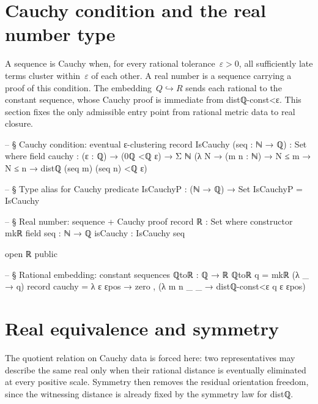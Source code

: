 \documentclass[11pt,a4paper]{book}
\def\mathbb#1{#1}%
\def\texttt#1{#1}%
\begin{document}
\section{Cauchy condition and the real number type}

A sequence is Cauchy when, for every rational tolerance~$\varepsilon > 0$,
all sufficiently late terms cluster within~$\varepsilon$ of each other.
A real number is a sequence carrying a proof of this condition.
The embedding~$\mathbb{Q} \hookrightarrow \mathbb{R}$ sends each rational
to the constant sequence, whose Cauchy proof is immediate from
\texttt{distℚ-const<ε}.  This section fixes the only admissible entry point
from rational metric data to real closure.

\begin{code}
-- § Cauchy condition: eventual ε-clustering
record IsCauchy (seq : ℕ → ℚ) : Set where
  field
    cauchy : (ε : ℚ) → (0ℚ <ℚ ε) → Σ ℕ (λ N → (m n : ℕ) → N ≤ m → N ≤ n → distℚ (seq m) (seq n) <ℚ ε)

-- § Type alias for Cauchy predicate
IsCauchyP : (ℕ → ℚ) → Set
IsCauchyP = IsCauchy

-- § Real number: sequence + Cauchy proof
record ℝ : Set where
  constructor mkℝ
  field
    seq : ℕ → ℚ
    isCauchy : IsCauchy seq

open ℝ public

-- § Rational embedding: constant sequences
ℚtoℝ : ℚ → ℝ
ℚtoℝ q = mkℝ (λ _ → q) record
  { cauchy = λ ε εpos →
      zero , (λ m n _ _ → distℚ-const<ε q ε εpos)
  }
\end{code}


\section{Real equivalence and symmetry}

The quotient relation on Cauchy data is forced here: two representatives may describe the same real only when their rational distance is eventually eliminated at every positive scale. Symmetry then removes the residual orientation freedom, since the witnessing distance is already fixed by the symmetry law for \texttt{distℚ}.
\end{document}
